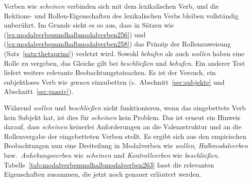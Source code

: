 Verben wie \textit{scheinen} verbinden sich mit dem lexikalischen Verb, und die Rek\-tions- und Rollen-Eigenschaften des lexikalischen Verbs bleiben vollständig unberührt.
Im Grunde sieht es so aus, dass in Sätzen wie (\ref{ex:modalverbenundhalbmodalverben256}) und (\ref{ex:modalverbenundhalbmodalverben258}) das Prinzip der Rollenzuweisung (Satz~\ref{satz:thetaprinz}) verletzt wird.
Sowohl \textit{behufen} als auch \textit{wollen} haben eine Rolle zu vergeben, das Gleiche gilt bei \textit{beschließen} und \textit{behufen}.
Ein anderer Test liefert weitere relevante Beobachtungstatsachen.
Es ist der Versuch, ein subjektloses Verb wie \textit{grauen} einzubetten (s.\ Abschnitt~\ref{sec:subjekte} und Abschnitt~\ref{sec:passiv}).

\begin{exe}
  \ex\label{ex:modalverbenundhalbmodalverben259}
  \begin{xlist}
  \end{xlist}
\end{exe}

Während \textit{wollen} und \textit{beschließen} nicht funktionieren, wenn das eingebettete Verb kein Subjekt hat, ist dies für \textit{scheinen} kein Problem.
Das ist erneut ein Hinweis darauf, dass \textit{scheinen} keinerlei Anforderungen an die Valenzstruktur und an die Rollenvergabe der eingebetteten Verben stellt.
Es ergibt sich aus den empirischen Beobachtungen nun eine Dreiteilung in Modalverben wie \textit{wollen}, \textit{Halbmodalverben} bzw.\ \textit{Anhebungsverben} wie \textit{scheinen} und \textit{Kontrollverben} wie \textit{beschließen}.
Tabelle~\ref{tab:modalverbenundhalbmodalverben263} fasst die relevanten Eigenschaften zusammen, die jetzt noch genauer erläutert werden.

\begin{table}[!htbp]
  \caption{Modalverben, Halbmodalverben und Kontrollverben}
  \label{tab:modalverbenundhalbmodalverben263}
\end{table}

